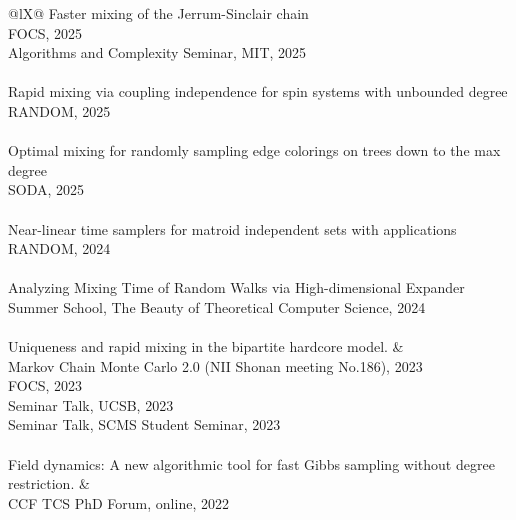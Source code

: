 \documentclass{article}
\begin{document}
\begin{xltabular}{\textwidth}{@{\hskip 0pt}lX@{\hskip 0pt}}
Faster mixing of the Jerrum-Sinclair chain\\
\hspace{20pt} FOCS, 2025\\
\hspace{20pt} Algorithms and Complexity Seminar, MIT, 2025\\
\\
Rapid mixing via coupling independence for spin systems with unbounded degree\\
\hspace{20pt} RANDOM, 2025\\
\\
Optimal mixing for randomly sampling edge colorings on trees down to the max degree \\
\hspace{20pt} SODA, 2025 \\
\\
Near-linear time samplers for matroid independent sets with applications \\
\hspace{20pt} RANDOM, 2024 \\
\\
Analyzing Mixing Time of Random Walks via High-dimensional Expander \\
\hspace{20pt} Summer School, The Beauty of Theoretical Computer Science, 2024\\
\\
Uniqueness and rapid mixing in the bipartite hardcore model. & \\
\hspace{20pt} Markov Chain Monte Carlo 2.0 (NII Shonan meeting No.186), 2023 \\
\hspace{20pt} FOCS, 2023\\
\hspace{20pt} Seminar Talk, UCSB, 2023\\
\hspace{20pt} Seminar Talk, SCMS Student Seminar, 2023\\
\\
Field dynamics: A new algorithmic tool for fast Gibbs sampling without degree restriction. & \\
\hspace{20pt} CCF TCS PhD Forum, online, 2022
\end{xltabular}
\end{document}
